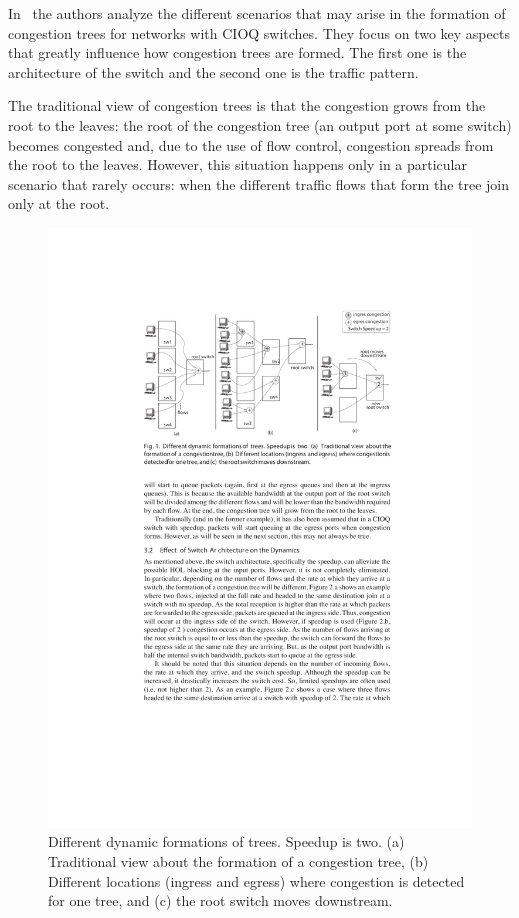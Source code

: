 \documentclass[12pt]{article}
\begin{document}
In~\cite{paper1} the authors analyze the different scenarios that may arise in the formation of congestion trees for networks with CIOQ switches. They focus on two key aspects that greatly influence how congestion trees are formed. The first one is the architecture of the switch and the second one is the traffic pattern. 

The traditional view of congestion trees is that the congestion grows from the root to the leaves: the root of the congestion tree (an output port at some switch) becomes congested and, due to the use of flow control, congestion spreads from the root to the leaves. However, this situation happens only in a particular scenario that rarely occurs: when the different traffic flows that form the tree join only at the root.

\begin{figure}[ht]
	\centering
		\includegraphics{figures/congestion_dynamics.pdf}
		\caption{Different dynamic formations of trees. Speedup is two. (a) Traditional view about the formation of a congestion tree, (b) Different locations (ingress and egress) where congestion is detected for one tree, and (c) the root switch moves downstream.}
		\label{fig:congestion_dynamics}
\end{figure}
\end{document}
